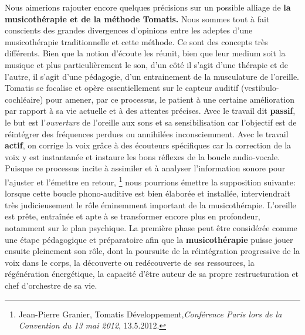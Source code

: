Nous aimerions rajouter encore quelques précisions sur un possible alliage de
\textbf{la musicothérapie et de la méthode Tomatis.} Nous sommes tout à fait conscients des
 grandes divergences d'opinions entre les adeptes d'une musicothérapie
 traditionnelle et cette méthode.
Ce sont des concepts très différents. Bien que la notion d'écoute les réunit, bien que leur medium soit la musique et plus particulièrement le son, d'un côté il s'agit d'une thérapie et de l'autre, il s'agit d'une pédagogie, d'un entrainement de la musculature de l'oreille. 
Tomatis se focalise et opère essentiellement sur le capteur auditif
(vestibulo-cochléaire) pour amener, par ce processus, le patient à une
certaine  amélioration par rapport à sa vie actuelle et à des attentes
précises. %
Avec le travail dit\textbf{ passif}, le  but est l'\emph{ouverture} de l'oreille
aux sons et sa sensibilisation car l'objectif est de réintégrer
des fréquences perdues ou annihilées inconsciemment. 
 Avec le travail \textbf{actif}, on corrige la voix grâce à des écouteurs spécifiques 
car la correction de la voix y est instantanée et instaure les bons
réflexes de la boucle audio-vocale. Puisque ce processus incite à
assimiler et à analyser l'information sonore pour l'ajuster et
l'émettre en retour,%
\footnote{Jean-Pierre Granier, Tomatis 
Développement,\emph{Conférence Paris lors de la Convention du 13 mai 2012}, 13.5.2012.}
nous pourrions émettre la supposition suivante: lorsque cette boucle
phono-auditive est bien élaborée et installée, interviendrait très judicieusement le
rôle éminemment important de la musicothérapie. L'oreille est
prête, entraînée et apte à se transformer encore plus en profondeur, notamment sur le
plan psychique. %
 La première phase peut être considérée comme une étape pédagogique et
 préparatoire afin que la
 \textbf{musicothérapie} puisse jouer ensuite pleinement son rôle, dont
la poursuite de la réintégration progressive de la voix dans
le corps, la découverte ou redécouverte de ses ressources,
la régénération énergétique, la capacité d'être auteur de sa propre
restructuration et chef d'orchestre de sa
vie.


